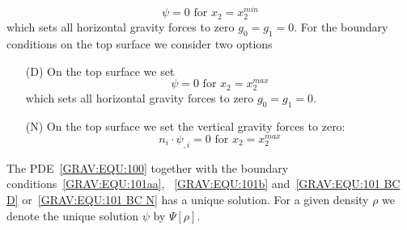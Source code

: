 \begin{equation}\label{GRAV:EQU:101b}
\psi = 0 \mbox{ for } x_2=x^{min}_2
\end{equation} 
which sets all horizontal gravity forces to zero $g_0=g_1=0$. 
For the boundary conditions on the top surface we consider two options
\begin{itemize}
 \item[(D)] 
On the top surface we set 
\begin{equation}\label{GRAV:EQU:101 BC D}
\psi = 0 \mbox{ for } x_2=x^{max}_2
\end{equation} 
which sets all horizontal gravity forces to zero $g_0=g_1=0$.
 \item[(N)] 
On the top surface we set the vertical gravity forces to zero:
\begin{equation}\label{GRAV:EQU:101 BC N}
n_i \cdot  \psi_{,i} = 0 \mbox{ for } x_2=x^{max}_2
\end{equation} 
\end{itemize}
The PDE~\ref{GRAV:EQU:100} together with the boundary conditions~\ref{GRAV:EQU:101aa}, ~\ref{GRAV:EQU:101b}
and~\ref{GRAV:EQU:101 BC D} or~\ref{GRAV:EQU:101 BC N}
has a unique solution. For a given density $\rho$ we denote the unique solution $\psi$ by $\Psi[\rho]$.


